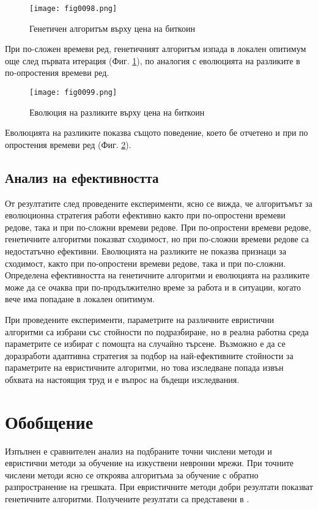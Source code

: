 \begin{figure}[H]
  \centering
  \texttt{[image: fig0098.png]}
  \caption{Генетичен алгоритъм върху цена на биткоин}
\label{fig0098}
\end{figure}

При по-сложен времеви ред, генетичният алгоритъм изпада в локален опитимум още след първата итерация (Фиг. \ref{fig0098}), по аналогия с еволюцията на разликите в по-опростения времеви ред.

\begin{figure}[H]
  \centering
  \texttt{[image: fig0099.png]}
  \caption{Еволюция на разликите върху цена на биткоин}
\label{fig0099}
\end{figure}

Еволюцията на разликите показва същото поведение, което бе отчетено и при по опростения времеви ред (Фиг. \ref{fig0099}).

\subsection{Анализ на ефективността}

От резултатите след проведените експерименти, ясно се вижда, че алгоритъмът за еволюционна стратегия работи ефективно както при по-опростени времеви редове, така и при по-сложни времеви редове. При по-опростени времеви редове, генетичните алгоритми показват сходимост, но при по-сложни времеви редове са недостатъчно ефективни. Еволюцията на разликите не показва признаци за сходимост, както при по-опростени времеви редове, така и при по-сложни. Определена ефективността на генетичните алгоритми и еволюцията на разликите може да се очаква при по-продължително време за работа и в ситуации, когато вече има попадане в локален опитимум. 

При проведените експерименти, параметрите на различните евристични алгоритми са избрани със стойности по подразбиране, но в реална работна среда параметрите се избират с помощта на случайно търсене. Възможно е да се доразработи адаптивна стратегия за подбор на най-ефективните стойности за параметрите на евристичните алгоритми, но това изследване попада извън обхвата на настоящия труд и е въпрос на бъдещи изследвания. 

\section{Обобщение}

Изпълнен е сравнителен анализ на подбраните точни числени методи и евристични методи за обучение на изкуствени невронни мрежи. При точните числени методи ясно се откроява алгоритъма за обучение с обратно разпространение на грешката. При евристичните методи добри резултати показват генетичните алгоритми. Получените резултати са представени в \cite{Tomov-08}.


